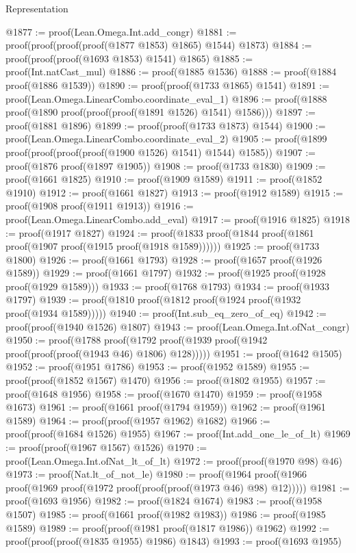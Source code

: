 \begin{lexlean}{Representation}
\begin{coremodule}
@1877 := proof(Lean.Omega.Int.add_congr)
@1881 := proof(proof(proof(proof(@1877 @1853) @1865) @1544) @1873)
@1884 := proof(proof(proof(@1693 @1853) @1541) @1865)
@1885 := proof(Int.natCast_mul)
@1886 := proof(@1885 @1536)
@1888 := proof(@1884 proof(@1886 @1539))
@1890 := proof(proof(@1733 @1865) @1541)
@1891 := proof(Lean.Omega.LinearCombo.coordinate_eval_1)
@1896 := proof(@1888 proof(@1890 proof(proof(proof(@1891 @1526) @1541) @1586)))
@1897 := proof(@1881 @1896)
@1899 := proof(proof(@1733 @1873) @1544)
@1900 := proof(Lean.Omega.LinearCombo.coordinate_eval_2)
@1905 := proof(@1899 proof(proof(proof(proof(@1900 @1526) @1541) @1544) @1585))
@1907 := proof(@1876 proof(@1897 @1905))
@1908 := proof(@1733 @1830)
@1909 := proof(@1661 @1825)
@1910 := proof(@1909 @1589)
@1911 := proof(@1852 @1910)
@1912 := proof(@1661 @1827)
@1913 := proof(@1912 @1589)
@1915 := proof(@1908 proof(@1911 @1913))
@1916 := proof(Lean.Omega.LinearCombo.add_eval)
@1917 := proof(@1916 @1825)
@1918 := proof(@1917 @1827)
@1924 := proof(@1833 proof(@1844 proof(@1861 proof(@1907 proof(@1915 proof(@1918 @1589))))))
@1925 := proof(@1733 @1800)
@1926 := proof(@1661 @1793)
@1928 := proof(@1657 proof(@1926 @1589))
@1929 := proof(@1661 @1797)
@1932 := proof(@1925 proof(@1928 proof(@1929 @1589)))
@1933 := proof(@1768 @1793)
@1934 := proof(@1933 @1797)
@1939 := proof(@1810 proof(@1812 proof(@1924 proof(@1932 proof(@1934 @1589)))))
@1940 := proof(Int.sub_eq_zero_of_eq)
@1942 := proof(proof(@1940 @1526) @1807)
@1943 := proof(Lean.Omega.Int.ofNat_congr)
@1950 := proof(@1788
      proof(@1792 proof(@1939 proof(@1942 proof(proof(proof(@1943 @46) @1806) @128)))))
@1951 := proof(@1642 @1505)
@1952 := proof(@1951 @1786)
@1953 := proof(@1952 @1589)
@1955 := proof(proof(@1852 @1567) @1470)
@1956 := proof(@1802 @1955)
@1957 := proof(@1648 @1956)
@1958 := proof(@1670 @1470)
@1959 := proof(@1958 @1673)
@1961 := proof(@1661 proof(@1794 @1959))
@1962 := proof(@1961 @1589)
@1964 := proof(proof(@1957 @1962) @1682)
@1966 := proof(proof(@1684 @1526) @1955)
@1967 := proof(Int.add_one_le_of_lt)
@1969 := proof(proof(@1967 @1567) @1526)
@1970 := proof(Lean.Omega.Int.ofNat_lt_of_lt)
@1972 := proof(proof(@1970 @98) @46)
@1973 := proof(Nat.lt_of_not_le)
@1980 := proof(@1964 proof(@1966 proof(@1969 proof(@1972 proof(proof(proof(@1973 @46) @98) @12)))))
@1981 := proof(@1693 @1956)
@1982 := proof(@1824 @1674)
@1983 := proof(@1958 @1507)
@1985 := proof(@1661 proof(@1982 @1983))
@1986 := proof(@1985 @1589)
@1989 := proof(proof(@1981 proof(@1817 @1986)) @1962)
@1992 := proof(proof(proof(@1835 @1955) @1986) @1843)
@1993 := proof(@1693 @1955)

\end{coremodule}
\end{lexlean}

